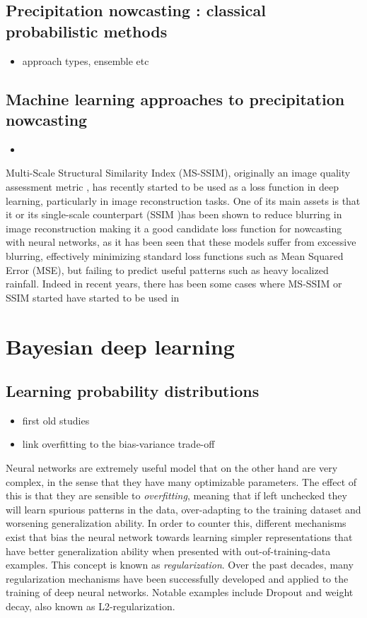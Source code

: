 \subsection{Precipitation nowcasting : classical probabilistic methods}
\begin{itemize}
	\item approach types, ensemble etc
\end{itemize}

\subsection{Machine learning approaches to precipitation nowcasting}
\begin{itemize}
	\item 
\end{itemize}

Multi-Scale Structural Similarity Index (MS-SSIM), originally an image quality assessment metric \cite{wang_multiscale_2003}, has recently started to be used as a loss function in deep learning, particularly in image reconstruction tasks. One of its main assets is that it or its single-scale counterpart (SSIM )has been shown to reduce blurring in image reconstruction \cite{zhao_loss_2017} making it a good candidate loss function for nowcasting with neural networks, as it has been seen that these models suffer from excessive blurring, effectively minimizing standard loss functions such as Mean Squared Error (MSE), but failing to predict useful patterns such as heavy localized rainfall. Indeed in recent years, there has been some cases where MS-SSIM or SSIM started have started to be used in 

\section{Bayesian deep learning}

\subsection{Learning probability distributions}
\begin{itemize}
	\item first old studies
	\item link overfitting to the bias-variance trade-off
\end{itemize}

	Neural networks are extremely useful model that on the other hand are very complex, in the sense that they have many optimizable parameters. The effect of this is that they are sensible to \textit{overfitting}, meaning that if left unchecked they will learn spurious patterns in the data, over-adapting to the training dataset and worsening generalization ability. In order to counter this, different mechanisms exist that bias the neural network towards learning simpler representations that have better generalization ability when presented with out-of-training-data examples. This concept is known as \textit{regularization}. Over the past decades, many regularization mechanisms have been successfully developed and applied to the training of deep neural networks. Notable examples include Dropout and weight decay, also known as L2-regularization.  
	
